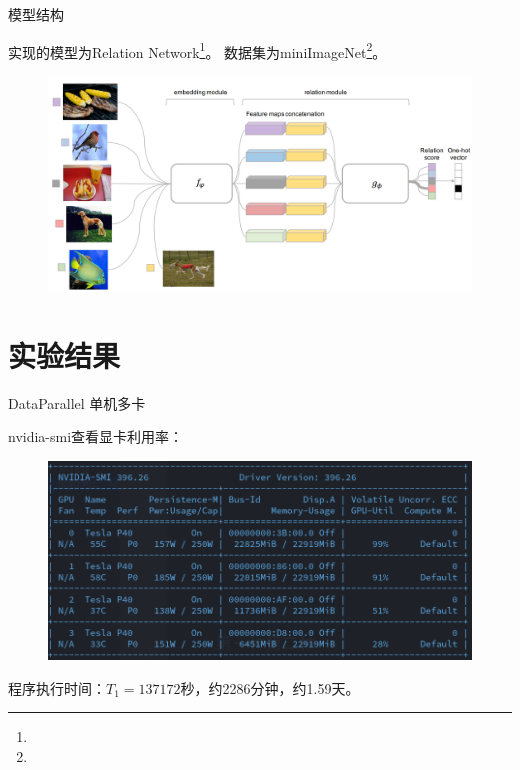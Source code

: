 \documentclass[algorithm,pgfplots]{cuzbeamer}
\begin{document}
    \begin{frame}{模型结构}
        \begin{leftbar}            
            实现的模型为Relation Network\footnote{}。
            数据集为miniImageNet\footnote{}。
        \end{leftbar}
        \begin{figure}[h]
            \includegraphics[scale=0.24]{figure/compare.png}
        \end{figure}
    \end{frame}



    \section{实验结果}
    
    \begin{frame}{DataParallel 单机多卡}
        \begin{leftbar}
            {\ttfamily nvidia-smi}查看显卡利用率：
        \end{leftbar}
        \begin{figure}
            \includegraphics[scale=0.4]{figure/01gpu-use.png}
        \end{figure}
        程序执行时间：$T_1=137172$秒，约2286分钟，约1.59天。
    \end{frame}
\end{document}
